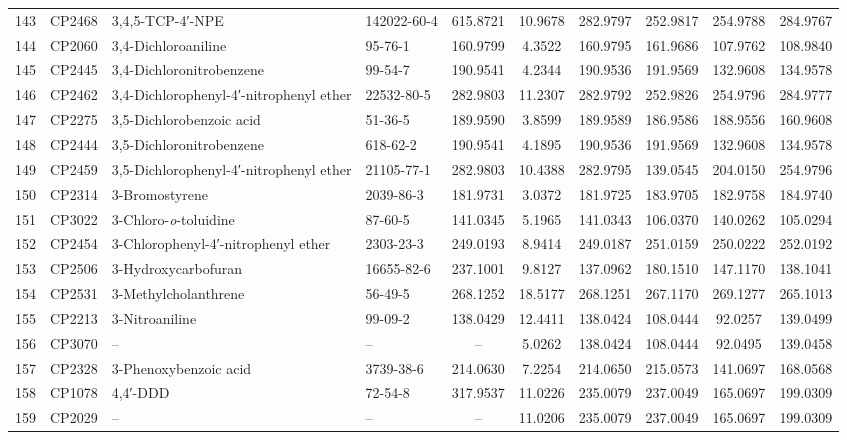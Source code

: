\begin{longtable}{clllcccccc}
143 & CP2468 & 3,4,5-TCP-4′-NPE & 142022-60-4 & 615.8721 & 10.9678 & 282.9797 & 252.9817 & 254.9788 & 284.9767 \\ 
144 & CP2060 & 3,4-Dichloroaniline & 95-76-1 & 160.9799 & 4.3522 & 160.9795 & 161.9686 & 107.9762 & 108.9840 \\ 
145 & CP2445 & 3,4-Dichloronitrobenzene & 99-54-7 & 190.9541 & 4.2344 & 190.9536 & 191.9569 & 132.9608 & 134.9578 \\ 
146 & CP2462 & 3,4-Dichlorophenyl-4′-nitrophenyl ether & 22532-80-5 & 282.9803 & 11.2307 & 282.9792 & 252.9826 & 254.9796 & 284.9777 \\ 
147 & CP2275 & 3,5-Dichlorobenzoic acid & 51-36-5 & 189.9590 & 3.8599 & 189.9589 & 186.9586 & 188.9556 & 160.9608 \\ 
148 & CP2444 & 3,5-Dichloronitrobenzene & 618-62-2 & 190.9541 & 4.1895 & 190.9536 & 191.9569 & 132.9608 & 134.9578 \\ 
149 & CP2459 & 3,5-Dichlorophenyl-4′-nitrophenyl ether & 21105-77-1 & 282.9803 & 10.4388 & 282.9795 & 139.0545 & 204.0150 & 254.9796 \\ 
150 & CP2314 & 3-Bromostyrene & 2039-86-3 & 181.9731 & 3.0372 & 181.9725 & 183.9705 & 182.9758 & 184.9740 \\ 
151 & CP3022 & 3-Chloro-\textit{o}-toluidine\smash{\textsuperscript{\textdaggerdbl}} & 87-60-5 & 141.0345 & 5.1965 & 141.0343 & 106.0370 & 140.0262 & 105.0294 \\ 
152 & CP2454 & 3-Chlorophenyl-4′-nitrophenyl ether & 2303-23-3 & 249.0193 & 8.9414 & 249.0187 & 251.0159 & 250.0222 & 252.0192 \\ 
153 & CP2506 & 3-Hydroxycarbofuran\smash{\textsuperscript{\textdaggerdbl}} & 16655-82-6 & 237.1001 & 9.8127 & 137.0962 & 180.1510 & 147.1170 & 138.1041 \\ 
154 & CP2531 & 3-Methylcholanthrene & 56-49-5 & 268.1252 & 18.5177 & 268.1251 & 267.1170 & 269.1277 & 265.1013 \\ 
155 & CP2213 & 3-Nitroaniline & 99-09-2 & 138.0429 & 12.4411 & 138.0424 & 108.0444 & 92.0257 & 139.0499 \\ 
156 & CP3070 & – & – & – & 5.0262 & 138.0424 & 108.0444 & 92.0495 & 139.0458 \\ 
157 & CP2328 & 3-Phenoxybenzoic acid & 3739-38-6 & 214.0630 & 7.2254 & 214.0650 & 215.0573 & 141.0697 & 168.0568 \\ 
158 & CP1078 & 4,4′-DDD & 72-54-8 & 317.9537 & 11.0226 & 235.0079 & 237.0049 & 165.0697 & 199.0309 \\ 
159 & CP2029 & – & – & – & 11.0206 & 235.0079 & 237.0049 & 165.0697 & 199.0309 \\ 

\end{longtable}
